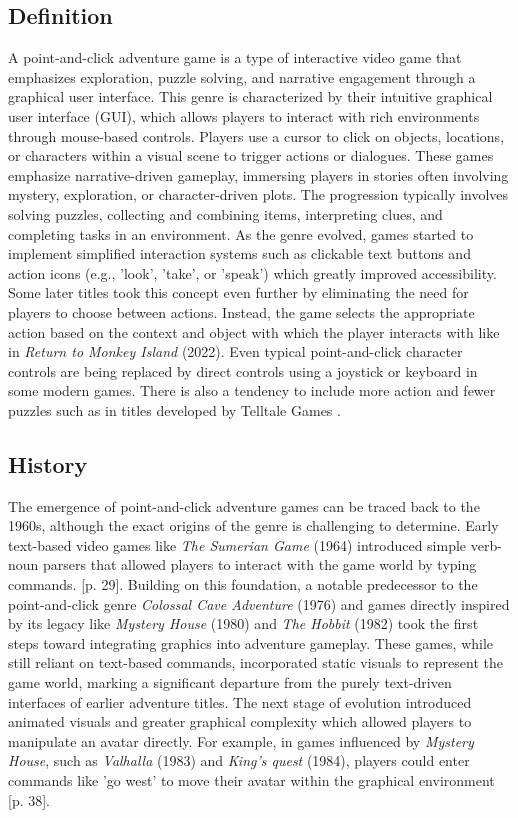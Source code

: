 \subsection{Definition}
A point-and-click adventure game is a type of interactive video game that emphasizes exploration, puzzle solving, and narrative engagement through a graphical user interface. This genre is characterized by their intuitive graphical user interface (GUI), which allows players to interact with rich environments through mouse-based controls. Players use a cursor to click on objects, locations, or characters within a visual scene to trigger actions or dialogues. These games emphasize narrative-driven gameplay, immersing players in stories often involving mystery, exploration, or character-driven plots. The progression typically involves solving puzzles, collecting and combining items, interpreting clues, and completing tasks in an environment. As the genre evolved, games started to implement simplified interaction systems such as clickable text buttons and action icons (e.g., 'look', 'take', or 'speak') which greatly improved accessibility. Some later titles took this concept even further by eliminating the need for players to choose between actions. Instead, the game selects the appropriate action based on the context and object with which the player interacts with like in \textit{Return to Monkey Island} (2022). Even typical point-and-click character controls are being replaced by direct controls using a joystick or keyboard in some modern games. There is also a tendency to include more action and fewer puzzles such as in titles developed by Telltale Games \cite{Carton2023history}. 


\subsection{History}
The emergence of point-and-click adventure games can be traced back to the 1960s, although the exact origins of the genre is challenging to determine. Early text-based video games like \textit{The Sumerian Game} (1964) introduced simple verb-noun parsers that allowed players to interact with the game world by typing commands. \cite{Salter2014}[p. 29]. Building on this foundation, a notable predecessor to the point-and-click genre \textit{Colossal Cave Adventure} (1976) and games directly inspired by its legacy like \textit{Mystery House} (1980) and \textit{The Hobbit} (1982) took the first steps toward integrating graphics into adventure gameplay. These games, while still reliant on text-based commands, incorporated static visuals to represent the game world, marking a significant departure from the purely text-driven interfaces of earlier adventure titles. The next stage of evolution introduced animated visuals and greater graphical complexity which allowed players to manipulate an avatar directly. For example, in games influenced by \textit{Mystery House}, such as \textit{Valhalla} (1983) and \textit{King's quest} (1984), players could enter commands like 'go west' to move their avatar within the graphical environment \cite{Salter2014}[p. 38]. 

